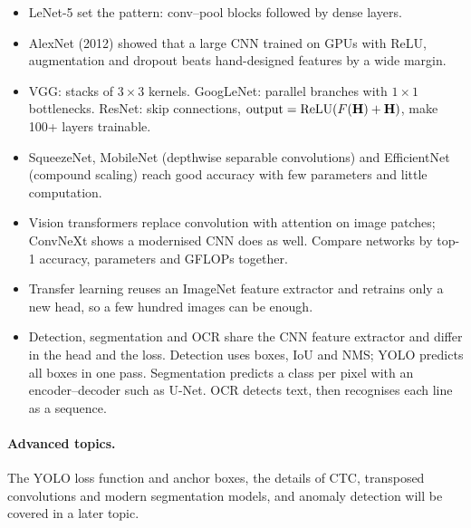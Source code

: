 \documentclass[12pt, a4paper]{article}
\providecommand{\bH}{\mathbf{H}}
\begin{document}
\begin{itemize}
  \item LeNet-5 set the pattern: conv--pool blocks followed by dense layers.
  \item AlexNet (2012) showed that a large CNN trained on GPUs with ReLU,
        augmentation and dropout beats hand-designed features by a wide
        margin.
  \item VGG: stacks of $3\times3$ kernels. GoogLeNet: parallel branches with
        $1\times1$ bottlenecks. ResNet: skip connections,
        $\text{output} = \relu(F(\bH) + \bH)$, make 100+ layers trainable.
  \item SqueezeNet, MobileNet (depthwise separable convolutions) and
        EfficientNet (compound scaling) reach good accuracy with few
        parameters and little computation.
  \item Vision transformers replace convolution with attention on image
        patches; ConvNeXt shows a modernised CNN does as well. Compare
        networks by top-1 accuracy, parameters and GFLOPs together.
  \item Transfer learning reuses an ImageNet feature extractor and retrains
        only a new head, so a few hundred images can be enough.
  \item Detection, segmentation and OCR share the CNN feature extractor and
        differ in the head and the loss. Detection uses boxes, IoU and NMS;
        YOLO predicts all boxes in one pass. Segmentation predicts a class per
        pixel with an encoder--decoder such as U-Net. OCR detects text, then
        recognises each line as a sequence.
\end{itemize}

\paragraph{Advanced topics.}
The YOLO loss function and anchor boxes, the details of CTC, transposed
convolutions and modern segmentation models, and anomaly detection will be
covered in a later topic.
\end{document}
